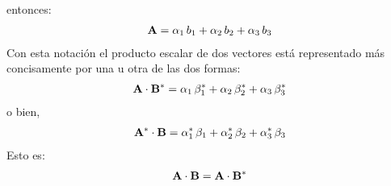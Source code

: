 \documentclass[12pt]{article}
\begin{document}
entonces:
\begin{align*}
    \vb{A} = \alpha_{1} \, b_{1} + \alpha_{2} \, b_{2} + \alpha_{3} \, b_{3}
\end{align*}
Con esta notación el producto escalar de dos vectores está representado más concisamente por una u otra de las dos formas:
\begin{align}
    \vb{A} \cdot \vb{B}^{*} = \alpha_{1} \, \beta_{1}^{*} + \alpha_{2} \, \beta_{2}^{*} + \alpha_{3} \, \beta_{3}^{*}
    \label{eq:ecuacion_01_50}
\end{align}
o bien,
\begin{align*}
    \vb{A}^{*} \cdot \vb{B} = \alpha_{1}^{*} \, \beta_{1} + \alpha_{2}^{*} \, \beta_{2} + \alpha_{3}^{*} \, \beta_{3}   
\end{align*}
Esto es:
\begin{align*}
    \vb{A} \cdot \vb{B} = \vb{A} \cdot \vb{B}^{*}
\end{align*}

\newpage
\end{document}
